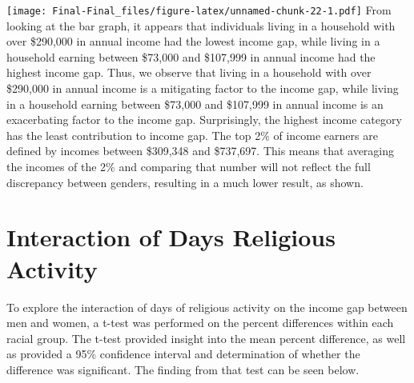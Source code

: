 \documentclass[
]{article}
\begin{document}
\texttt{[image: Final-Final\_files/figure-latex/unnamed-chunk-22-1.pdf]}
From looking at the bar graph, it appears that individuals living in a
household with over \$290,000 in annual income had the lowest income
gap, while living in a household earning between \$73,000 and \$107,999
in annual income had the highest income gap. Thus, we observe that
living in a household with over \$290,000 in annual income is a
mitigating factor to the income gap, while living in a household earning
between \$73,000 and \$107,999 in annual income is an exacerbating
factor to the income gap. Surprisingly, the highest income category has
the least contribution to income gap. The top 2\% of income earners are
defined by incomes between \$309,348 and \$737,697. This means that
averaging the incomes of the 2\% and comparing that number will not
reflect the full discrepancy between genders, resulting in a much lower
result, as shown.

\hypertarget{interaction-of-days-religious-activity}{%
\section{Interaction of Days Religious
Activity}\label{interaction-of-days-religious-activity}}

To explore the interaction of days of religious activity on the income
gap between men and women, a t-test was performed on the percent
differences within each racial group. The t-test provided insight into
the mean percent difference, as well as provided a 95\% confidence
interval and determination of whether the difference was significant.
The finding from that test can be seen below.
\end{document}
